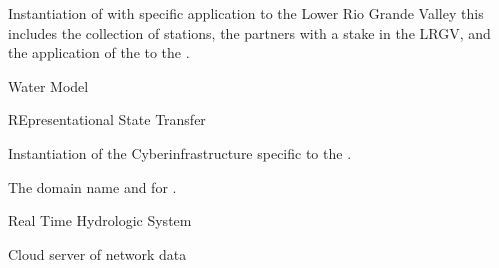 \documentclass[letterpaper,12pt,english,openany,oneside]{sphinxmanual}
\begin{document}
\begin{description}
\sphinxAtStartPar
Instantiation of {\hyperref[\detokenize{glossary:term-REON}]{}} with specific application to the Lower Rio Grande Valley \sphinxhyphen{} this includes the collection of {\hyperref[\detokenize{glossary:term-RTHS}]{}} stations, the {\hyperref[\detokenize{glossary:term-REON}]{}} partners with a stake in the LRGV, and the application of the {\hyperref[\detokenize{glossary:term-REON-WM}]{}} to the {\hyperref[\detokenize{glossary:term-LRGV}]{}}.

\sphinxAtStartPar
{\hyperref[\detokenize{glossary:term-REON}]{}} Water Model

\sphinxAtStartPar
REpresentational State Transfer

\sphinxAtStartPar
Instantiation of the {\hyperref[\detokenize{glossary:term-REON}]{}} Cyberinfrastructure specific to the {\hyperref[\detokenize{glossary:term-LRGV}]{}}.

\sphinxAtStartPar
The domain name and {\hyperref[\detokenize{glossary:term-URL}]{}} for {\hyperref[\detokenize{glossary:term-RGVFlood}]{}}.

\sphinxAtStartPar
Real Time Hydrologic System

\sphinxAtStartPar
Cloud server of {\hyperref[\detokenize{glossary:term-RTHS}]{}} network data


\end{description}
\end{document}
